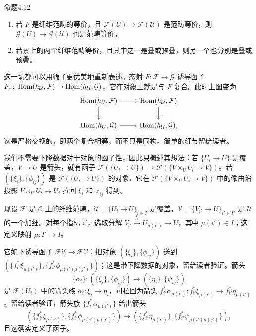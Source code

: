 \begin{origstatement}{命题}{4.12}\label{ch04:prop412}
\begin{enumerate}
 \item[(a)] 若 $F$ 是纤维范畴的等价，且 $\mathcal F(U)\to\mathcal F(\mathcal U)$ 是范畴等价，则 $\mathcal G(U)\to\mathcal G(\mathcal U)$ 也是范畴等价。
 \item[(b)] 若景上的两个纤维范畴等价，且其中之一是叠或预叠，则另一个也分别是叠或预叠。
\end{enumerate}
\end{origstatement}

这一切都可以用筛子更优美地重新表述。态射 $F\colon\mathcal F\to\mathcal G$ 诱导函子 $F_*\colon\operatorname{Hom}(h_{\mathcal U},\mathcal F)\to\operatorname{Hom}(h_{\mathcal U},\mathcal G)$，它在对象上就是与 $F$ 复合。此时上图变为
\[
\begin{tikzcd}
 \Hom(h_U,\mathcal F)\arrow[r]\arrow[d]&\Hom(h_{\mathcal U},\mathcal F)\arrow[d]\\
 \Hom(h_U,\mathcal G)\arrow[r]&\Hom(h_{\mathcal U},\mathcal G),
\end{tikzcd}
\]
这是严格交换的，即两个复合相等，而不只是同构。简单的细节留给读者。

我们不需要下降数据对于对象的函子性，因此只概述其想法：若 $\{U_i\to U\}$ 是覆盖，$V\to U$ 是箭头，就有函子
$\mathcal F(\{U_i\to U\})\to\mathcal F(\{V\times_U U_i\to V\})$。若 $(\{\xi_i\},\{\phi_{ij}\})$ 是 $\mathcal F(\{U_i\to U\})$ 的对象，它在 $\mathcal F(\{V\times_U U_i\to V\})$ 中的像由沿投影 $V\times_U U_i\to U_i$ 拉回 $\xi_i$ 和 $\phi_{ij}$ 得到。

现设 $\mathcal F$ 是 $\mathcal C$ 上的纤维范畴，$\mathcal U=\{U_i\to U\}_{i\in I}$ 是覆盖，$\mathcal V=\{V_{i'}\to U\}_{i'\in I'}$ 是 $\mathcal U$ 的一个加细。对每个指标 $i'$，选取分解 $V_{i'}\xrightarrow{f_{i'}}U_{\mu(i')}\to U$，其中 $\mu(i')\in I$；这定义映射 $\mu\colon I'\to I$。

它如下诱导函子 $\mathcal F\mathcal U\to\mathcal F\mathcal V$：把对象 $(\{\xi_i\},\{\phi_{ij}\})$ 送到
$(\{f_{i'}^*\xi_{\mu(i')}\},\{f_{i'}^*\phi_{\mu(i')\mu(j')}\})$；这是带下降数据的对象，留给读者验证。箭头
\[
 \{\alpha_i\}\colon(\{\xi_i\},\{\phi_{ij}\})\longrightarrow(\{\eta_i\},\{\psi_{ij}\})
\]
是 $\mathcal F(U_i)$ 中的箭头族 $\alpha_i\colon\xi_i\to\eta_i$，可拉回为箭头
$f_{i'}^*\alpha_{\mu(i')}\colon f_{i'}^*\xi_{\mu(i')}\to f_{i'}^*\eta_{\mu(i')}$。留给读者验证，箭头族 $\{f_{i'}^*\alpha_{\mu(i')}\}$ 给出箭头
\[
 (\{f_{i'}^*\xi_{\mu(i')}\},\{f_{i'}^*\phi_{\mu(i')\mu(j')}\})
 \longrightarrow(\{f_{i'}^*\eta_{\mu(i')}\},\{f_{i'}^*\psi_{\mu(i')\mu(j')}\}),
\]
且这确实定义了函子。

